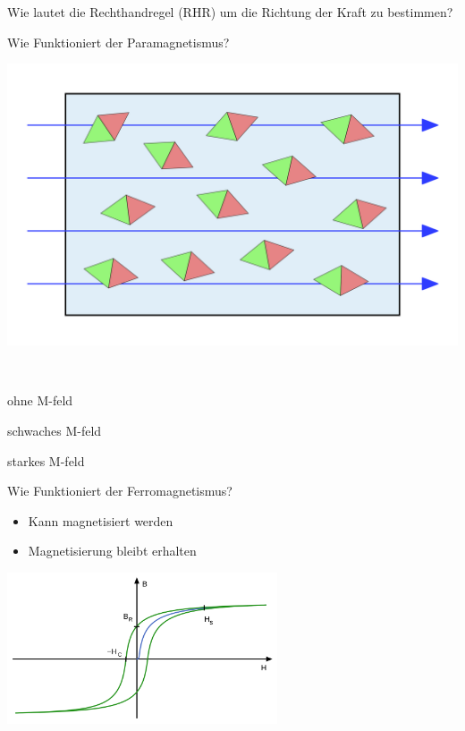 \begin{karte}{Wie lautet die Rechthandregel (RHR) um die Richtung der Kraft zu bestimmen?}
\begin{karte}{Wie Funktioniert der Paramagnetismus?}
\begin{center}
\begin{minipage}{0.32\textwidth}
		\end{minipage}
		\begin{minipage}{0.32\textwidth}
			\includegraphics[width=\textwidth]{pics/MS_Paramagnetismus_3.png} %
		\end{minipage}\\
		\begin{minipage}{0.32\textwidth}
			\center ohne M-feld
		\end{minipage}
		\begin{minipage}{0.32\textwidth}
			\center schwaches M-feld
		\end{minipage}
		\begin{minipage}{0.32\textwidth}
			\center starkes M-feld
		\end{minipage}
	\end{center}
\end{karte}

\begin{karte}{Wie Funktioniert der Ferromagnetismus?}
	\begin{itemize}
		\item Kann magnetisiert werden
		\item Magnetisierung bleibt erhalten
	\end{itemize}
	\center \includegraphics[width=0.6\textwidth]{pics/MS_Ferromagnetismus.png} %
\end{karte}


\end{karte}
